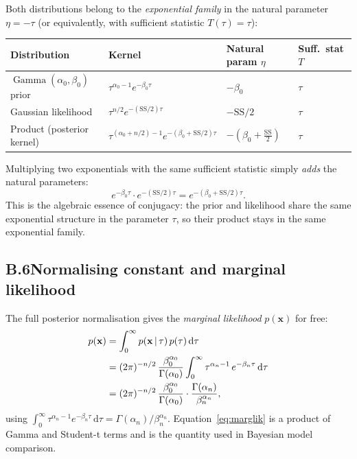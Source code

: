 \documentclass[11pt, a4paper]{article}
\newcommand{\Ga}{\operatorname{Gamma}}
\theoremstyle{definition}
\begin{document}
Both distributions belong to the \emph{exponential family} in the natural
parameter $\eta=-\tau$ (or equivalently, with sufficient statistic $T(\tau)=\tau$):

\medskip
\begin{center}
\begin{tabular}{llll}
\toprule
Distribution & Kernel & Natural param $\eta$ & Suff.\ stat $T$ \\
\midrule
$\Ga(\alpha_0,\beta_0)$ prior   & $\tau^{\alpha_0-1}e^{-\beta_0\tau}$ & $-\beta_0$ & $\tau$ \\
Gaussian likelihood              & $\tau^{n/2}e^{-(\mathrm{SS}/2)\tau}$ & $-\mathrm{SS}/2$ & $\tau$ \\
\midrule
Product (posterior kernel)       & $\tau^{(\alpha_0+n/2)-1}e^{-(\beta_0+\mathrm{SS}/2)\tau}$ & $-(\beta_0+\tfrac{\mathrm{SS}}{2})$ & $\tau$ \\
\bottomrule
\end{tabular}
\end{center}
\medskip

Multiplying two exponentials with the same sufficient statistic
simply \emph{adds} the natural parameters:
\[
  e^{-\beta_0\tau}\cdot e^{-(\mathrm{SS}/2)\tau}
  = e^{-(\beta_0+\mathrm{SS}/2)\tau}.
\]
This is the algebraic essence of conjugacy: the prior and likelihood share
the same exponential structure in the parameter $\tau$, so their product
stays in the same exponential family.

\subsection*{B.6\quad Normalising constant and marginal likelihood}

The full posterior normalisation gives the \emph{marginal likelihood}
$p(\mathbf{x})$ for free:
\begin{align}
  p(\mathbf{x})
  &= \int_0^\infty p(\mathbf{x}\,|\,\tau)\,p(\tau)\,\mathrm{d}\tau \notag\\
  &= (2\pi)^{-n/2}\,\frac{\beta_0^{\alpha_0}}{\Gamma(\alpha_0)}
     \int_0^\infty \tau^{\alpha_n-1}\,e^{-\beta_n\tau}\,\mathrm{d}\tau \notag\\
  &= (2\pi)^{-n/2}\,\frac{\beta_0^{\alpha_0}}{\Gamma(\alpha_0)}
     \cdot\frac{\Gamma(\alpha_n)}{\beta_n^{\alpha_n}},
  \label{eq:marglik}
\end{align}
using $\int_0^\infty \tau^{\alpha_n-1}e^{-\beta_n\tau}\,\mathrm{d}\tau
= \Gamma(\alpha_n)/\beta_n^{\alpha_n}$.
Equation~\eqref{eq:marglik} is a product of Gamma and Student-t terms
and is the quantity used in Bayesian model comparison.
\end{document}
